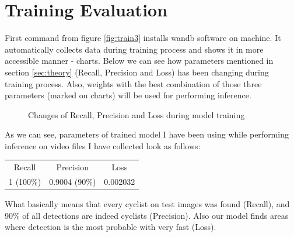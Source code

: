 \section{Training Evaluation}
\label{sec:eval}
First command from figure \ref{fig:train3} installs wandb software on machine. It automatically collects data during training process and shows it in more accessible manner - charts. Below we can see how parameters mentioned in section \ref{sec:theory} (Recall, Precision and Loss) has been changing during training process. Also, weights with the best combination of those three parameters (marked on charts) will be used for performing inference.
\begin{figure} [h]
    \centering
    \caption{Changes of Recall, Precision and Loss during model training}
    \label{fig:eval1}
\end{figure}
\newline As we can see, parameters of trained model I have been using while performing inference on video files I have collected look as follows:
\begin{center}
    \begin{tabular}{ccc}
    Recall    & Precision     & Loss     \\
    1 (100\%) & 0.9004 (90\%) & 0.002032
    \end{tabular}
\end{center}
What basically means that every cyclist on test images was found (Recall), and 90\% of all detections are indeed cyclists (Precision). Also our model finds areas where detection is the most probable with very fast (Loss).  